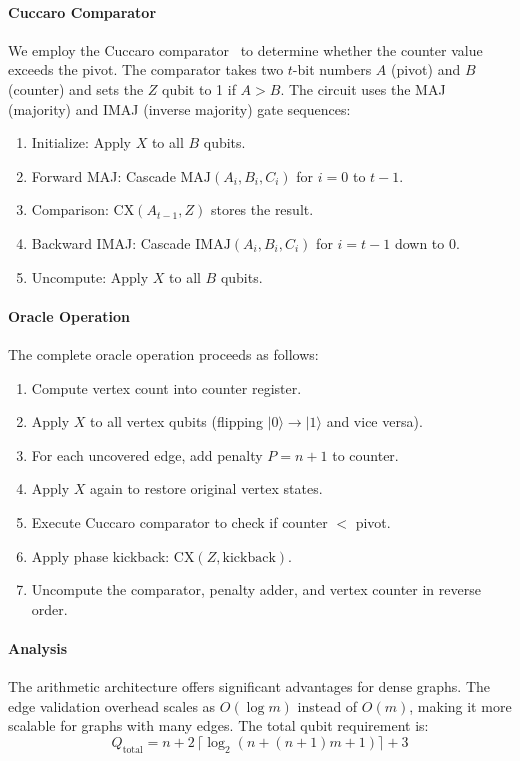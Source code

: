 \documentclass{ieeeaccess}
\begin{document}
\paragraph{Cuccaro Comparator}
We employ the Cuccaro comparator~\cite{benchasattabuse_quantum_2019}
to determine whether the counter value exceeds the pivot.
The comparator takes two $t$-bit numbers $A$ (pivot) and
$B$ (counter) and sets the $Z$ qubit to 1 if $A > B$.
The circuit uses the MAJ (majority) and IMAJ (inverse
majority) gate sequences:
\begin{enumerate}
    \item Initialize: Apply $X$ to all $B$ qubits.
    \item Forward MAJ: Cascade $\mathrm{MAJ}(A_i, B_i, C_i)$
    for $i = 0$ to $t-1$.
    \item Comparison: $\mathrm{CX}(A_{t-1}, Z)$ stores the
    result.
    \item Backward IMAJ: Cascade $\mathrm{IMAJ}(A_i, B_i,
    C_i)$ for $i = t-1$ down to 0.
    \item Uncompute: Apply $X$ to all $B$ qubits.
\end{enumerate}

\paragraph{Oracle Operation}
The complete oracle operation proceeds as follows:
\begin{enumerate}
    \item Compute vertex count into counter register.
    \item Apply $X$ to all vertex qubits
    (flipping $|0\rangle \to |1\rangle$ and vice versa).
    \item For each uncovered edge, add penalty $P = n+1$ to
    counter.
    \item Apply $X$ again to restore original vertex states.
    \item Execute Cuccaro comparator to check if counter
    $<$ pivot.
    \item Apply phase kickback: $\mathrm{CX}(Z,
    \mathrm{kickback})$.
    \item Uncompute the comparator, penalty adder, and vertex
    counter in reverse order.
\end{enumerate}

\paragraph{Analysis}
The arithmetic architecture offers significant advantages for
dense graphs. The edge validation overhead scales as
$O(\log m)$ instead of $O(m)$, making it more scalable for
graphs with many edges. The total qubit requirement is:
\begin{equation}
    Q_{\mathrm{total}}
    = n + 2\,\lceil\log_2(n + (n+1)m + 1)\rceil + 3
    \label{eq:arith-qubits}
\end{equation}
\end{document}
